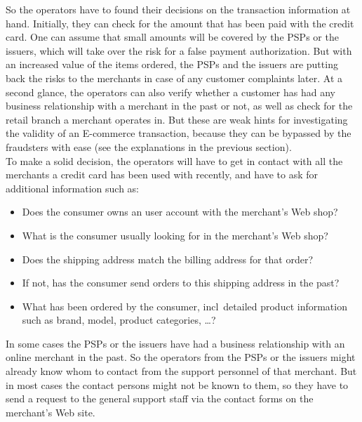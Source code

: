 So the operators have to found their decisions on the transaction information at hand. Initially, they can check for the amount that has been paid with the credit card. One can assume that small amounts will be covered by the \gls{PSP}s or the issuers, which will take over the risk for a false payment authorization. But with an increased value of the items ordered, the \gls{PSP}s and the issuers are putting back the risks to the merchants in case of any customer complaints later. At a second glance, the operators can also verify whether a customer has had any business relationship with a merchant in the past or not, as well as check for the retail branch a merchant operates in. But these are weak hints for investigating the validity of an \gls{E-commerce} transaction, because they can be bypassed by the fraudsters with ease (see the explanations in the previous section). \\

To make a solid decision, the operators will have to get in contact with all the merchants a credit card has been used with recently, and have to ask for additional information such as:\@

\begin{itemize}
  \item Does the consumer owns an user account with the merchant's Web shop?
  \item What is the consumer usually looking for in the merchant's Web shop?
  \item Does the shipping address match the billing address for that order?
  \item If not, has the consumer send orders to this shipping address in the past?
  \item What has been ordered by the consumer, \gls{incl}\ detailed product information such as brand, model, product categories, \ldots?
\end{itemize}

In some cases the \gls{PSP}s or the issuers have had a business relationship with an online merchant in the past. So the operators from the \gls{PSP}s or the issuers might already know whom to contact from the support personnel of that merchant. But in most cases the contact persons might not be known to them, so they have to send a request to the general support staff via the contact forms on the merchant's Web site. \\

